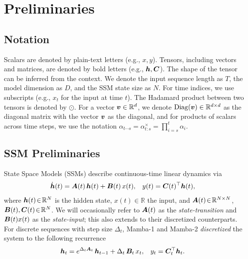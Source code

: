 \section{Preliminaries}
\subsection{Notation}
Scalars are denoted by plain-text letters (e.g., $x, y$). 
Tensors, including vectors and matrices, are denoted by bold letters (e.g., ${\bm{h}}, {\bm{C}}$). 
The shape of the tensor can be inferred from the context.
We denote the input sequence length as $T$, the model dimension as $D$, and the SSM state size as $N$. %
For time indices, we use subscripts (e.g., $x_t$ for the input at time $t$).
The Hadamard product between two tensors is denoted by $\odot$.
For a vector ${\bm{v}} \in \mathbb{R}^d$, we denote $\mathrm{Diag}({\bm{v}}) \in \mathbb{R}^{d \times d}$ as the diagonal matrix with the vector ${\bm{v}}$ as the diagonal, and for products of scalars across time steps, we use the notation $\alpha_{t \cdots s} = \alpha^\times_{t:s} = \prod_{i=s}^{t} \alpha_i$.

\subsection{SSM Preliminaries}

State Space Models (SSMs) describe continuous-time linear dynamics via
\begin{align*}
\dot{{\bm{h}}}(t) &= {\bm{A}}(t)\,{\bm{h}}(t) + {\bm{B}}(t)\,x(t), &
y(t) &= {\bm{C}}(t)^\top {\bm{h}}(t),
\end{align*}
where ${\bm{h}}(t)\!\in\!\mathbb{R}^N$ is the hidden state, $x(t)\!\in\!\mathbb{R}$ the input, and ${\bm{A}}(t)\!\in\!\mathbb{R}^{N\times N}$, ${\bm{B}}(t),{\bm{C}}(t)\!\in\!\mathbb{R}^N$.
We will occasionally refer to ${\bm{A}}(t)$ as the \emph{state-transition} and ${\bm{B}}(t)x(t)$ as the \emph{state-input}; this also extends to their discretized counterparts. 
For discrete sequences with step size $\Delta_t$,
Mamba-1 and Mamba-2 \emph{discretized} the system to the following recurrence
\begin{align*}
{\bm{h}}_t &= e^{\Delta_t {\bm{A}}_t}\,{\bm{h}}_{t-1} + \Delta_t\,{\bm{B}}_t\,x_t, &
y_t &= {\bm{C}}_t^\top {\bm{h}}_t .
\end{align*}

